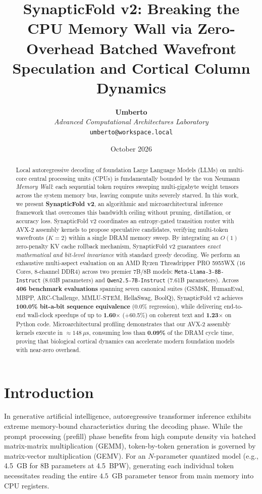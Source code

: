 \documentclass[journal,10pt,twocolumn]{article}
\title{\textbf{\Large SynapticFold v2: Breaking the CPU Memory Wall via Zero-Overhead Batched Wavefront Speculation and Cortical Column Dynamics}}
\author{\textbf{Umberto}\\
\textit{Advanced Computational Architectures Laboratory}\\
\texttt{umberto@workspace.local}}
\date{October 2026}
\theoremstyle{definition}
\begin{document}
\maketitle

\begin{abstract}
Local autoregressive decoding of foundation Large Language Models (LLMs) on multi-core central processing units (CPUs) is fundamentally bounded by the von Neumann \textit{Memory Wall}: each sequential token requires sweeping multi-gigabyte weight tensors across the system memory bus, leaving compute units severely starved. In this work, we present \textbf{SynapticFold v2}, an algorithmic and microarchitectural inference framework that overcomes this bandwidth ceiling without pruning, distillation, or accuracy loss. SynapticFold v2 coordinates an entropy-gated transition router with AVX-2 assembly kernels to propose speculative candidates, verifying multi-token wavefronts ($K=2$) within a single DRAM memory sweep. By integrating an $O(1)$ zero-penalty KV cache rollback mechanism, SynapticFold v2 guarantees \textit{exact mathematical and bit-level invariance} with standard greedy decoding. We perform an exhaustive multi-aspect evaluation on an AMD Ryzen Threadripper PRO 5955WX (16 Cores, 8-channel DDR4) across two premier 7B/8B models: \texttt{Meta-Llama-3-8B-Instruct} (8.03B parameters) and \texttt{Qwen2.5-7B-Instruct} (7.61B parameters). Across \textbf{406 benchmark evaluations} spanning seven canonical suites (GSM8K, HumanEval, MBPP, ARC-Challenge, MMLU-STEM, HellaSwag, BoolQ), SynapticFold v2 achieves \textbf{100.0\% bit-a-bit sequence equivalence} (0.0\% regression), while delivering end-to-end wall-clock speedups of up to \textbf{1.60$\times$} (+60.5\%) on coherent text and \textbf{1.23$\times$} on Python code. Microarchitectural profiling demonstrates that our AVX-2 assembly kernels execute in $\approx 148\ \mu\text{s}$, consuming less than \textbf{0.09\%} of the DRAM cycle time, proving that biological cortical dynamics can accelerate modern foundation models with near-zero overhead.
\end{abstract}

\section{Introduction}

In generative artificial intelligence, autoregressive transformer inference exhibits extreme memory-bound characteristics during the decoding phase. While the prompt processing (prefill) phase benefits from high compute density via batched matrix-matrix multiplication (GEMM), token-by-token generation is governed by matrix-vector multiplication (GEMV). For an $N$-parameter quantized model (e.g., 4.5~GB for 8B parameters at 4.5~BPW), generating each individual token necessitates reading the entire $4.5$~GB parameter tensor from main memory into CPU registers. 
\end{document}
